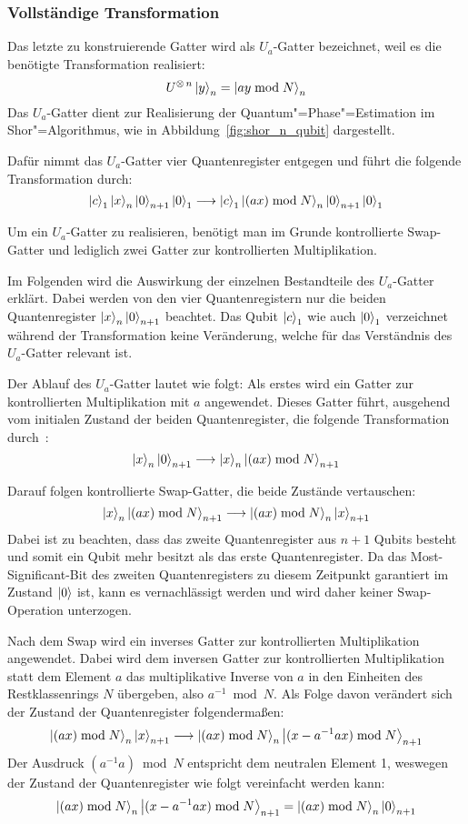 \subsubsection{Vollständige Transformation}

Das letzte zu konstruierende Gatter wird als \(U_a\)-Gatter bezeichnet, 
weil es die benötigte Transformation realisiert: 
\[U^{\operatorname{\otimes} n}\ket{y}_n = \ket{ay \bmod N}_n\] 
Das \(U_a\)-Gatter dient zur Realisierung der Quantum"=Phase"=Estimation im Shor"=Algorithmus, 
wie in Abbildung~\ref{fig:shor_n_qubit} dargestellt.

Dafür nimmt das \(U_a\)-Gatter vier Quantenregister entgegen und 
führt die folgende Transformation durch: 
\[\ket{c}_1\ket{x}_{n}\ket{0}_{n+1}\ket{0}_1
\longrightarrow
\ket{c}_1\ket{(a x) \bmod N}_{n}\ket{0}_{n+1}\ket{0}_1
\]

Um ein \(U_a\)-Gatter zu realisieren, benötigt man im Grunde kontrollierte Swap-Gatter und 
lediglich zwei Gatter zur kontrollierten Multiplikation. 
 
Im Folgenden wird die Auswirkung der einzelnen Bestandteile des \(U_a\)-Gatter erklärt.
Dabei werden von den vier Quantenregistern nur die beiden 
Quantenregister \(\ket{x}_{n}\ket{0}_{n+1}\) beachtet.
Das Qubit \(\ket{c}_1\) wie auch \(\ket{0}_1\) verzeichnet während der Transformation keine Veränderung, 
welche für das Verständnis des \(U_a\)-Gatter relevant ist.

Der Ablauf des \(U_a\)-Gatter lautet wie folgt:
Als erstes wird ein Gatter zur kontrollierten Multiplikation mit \(a\) angewendet. 
Dieses Gatter führt, 
ausgehend vom initialen Zustand der beiden Quantenregister, 
die folgende Transformation durch~\cite{beauregard2003circuit}:
\[
  \ket{x}_{n}\ket{0}_{n+1}
  \longrightarrow
  \ket{x}_{n}\ket{(ax)\bmod N}_{n+1}
  \]

Darauf folgen kontrollierte Swap-Gatter, die beide Zustände vertauschen:
\[
  \ket{x}_{n}\ket{(ax)\bmod N}_{n+1}
\longrightarrow
\ket{(ax)\bmod N}_{n}\ket{x}_{n+1}
\]
Dabei ist zu beachten, 
dass das zweite Quantenregister aus \(n+1\) Qubits besteht und
somit ein Qubit mehr besitzt als das erste Quantenregister.
Da das Most-Significant-Bit des zweiten Quantenregisters zu diesem Zeitpunkt garantiert im Zustand \(\ket{0}\) ist, 
kann es vernachlässigt werden und wird daher keiner Swap-Operation unterzogen.

Nach dem Swap wird ein inverses Gatter zur kontrollierten Multiplikation angewendet.
Dabei wird dem inversen Gatter zur kontrollierten Multiplikation statt dem Element \(a\) 
das multiplikative Inverse von \(a\) in den Einheiten des Restklassenrings \(N\) übergeben, 
also \(a^{-1} \bmod N\).
Als Folge davon verändert sich der Zustand der Quantenregister folgendermaßen:  
\[\ket{(ax)\bmod N}_{n}\ket{x}_{n+1}
\longrightarrow
\ket{(ax)\bmod N}_{n}\ket{(x-a^{-1}ax)\bmod N}_{n+1}
\] 
Der Ausdruck \((a^{-1}a)\bmod N\) entspricht dem neutralen Element 1, 
weswegen der Zustand der Quantenregister wie folgt vereinfacht werden kann:  
\[
\ket{(ax)\bmod N}_{n}\ket{(x-a^{-1}ax)\bmod N}_{n+1}
=
\ket{(ax)\bmod N}_{n}\ket{0}_{n+1}
\] 

